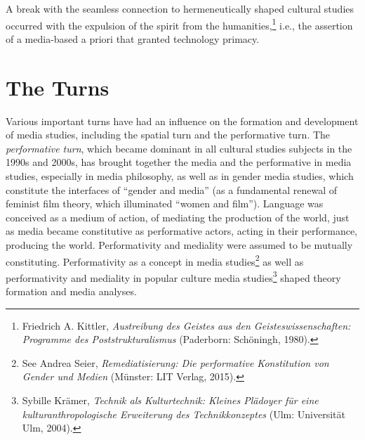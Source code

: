 \documentclass{tufte-handout}
\begin{document}
A break with the seamless connection to hermeneutically shaped cultural
studies occurred with the expulsion of the spirit from the
humanities,\footnote{Friedrich A. Kittler, \emph{Austreibung des Geistes
  aus den Geisteswissenschaften: Programme des Poststrukturalismus}
  (Paderborn: Schöningh, 1980).} i.e., the assertion of a media-based a
priori that granted technology primacy.

\hypertarget{the-turns}{%
\section{\texorpdfstring{The Turns }{The Turns }}\label{the-turns}}

Various important turns have had an influence on the formation and
development of media studies, including the spatial turn and the
performative turn. The \emph{performative turn}, which became dominant
in all cultural studies subjects in the 1990s and 2000s, has brought
together the media and the performative in media studies, especially in
media philosophy, as well as in gender media studies, which constitute
the interfaces of ``gender and media'' (as a fundamental renewal of
feminist film theory, which illuminated ``women and film''). Language
was conceived as a medium of action, of mediating the production of the
world, just as media became constitutive as performative actors, acting
in their performance, producing the world. Performativity and mediality
were assumed to be mutually constituting. Performativity as a concept in
media studies\footnote{See Andrea Seier, \emph{Remediatisierung: Die
  performative Konstitution von Gender und Medien} (Münster: LIT Verlag,
  2015).} as well as performativity and mediality in popular culture
media studies\footnote{Sybille Krämer, \emph{Technik als Kulturtechnik:
  Kleines Plädoyer für eine kulturanthropologische Erweiterung des
  Technikkonzeptes} (Ulm: Universität Ulm, 2004).} shaped theory
formation and media analyses.
\end{document}
